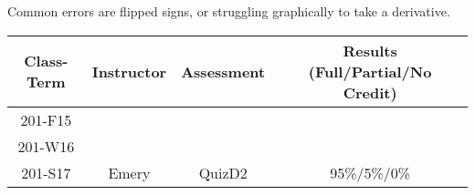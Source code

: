 \begin{outcomes}
Common errors are flipped signs, or struggling graphically to take a derivative.
	\begin{center}
		\begin{tabular}{cccc}
			\hline\hline
                Class-Term & Instructor & Assessment & Results (Full/Partial/No Credit) \\
			\hline
                201-F15 &  &  &  \\
                201-W16 &  &  &  \\
                201-S17 & Emery & QuizD2 & 95\%/5\%/0\%\\
			\hline
		\end{tabular}
	\end{center}
\end{outcomes}

\begin{comments}
	
\end{comments}
